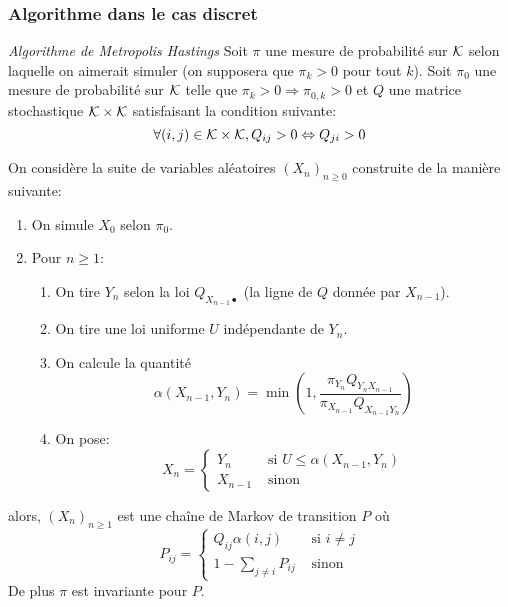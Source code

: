 \subsubsection{Algorithme dans le cas discret}

\begin{propriete}{\textit{Algorithme de Metropolis Hastings}}
Soit $\pi$ une mesure de probabilité sur $\mathcal{K}$ selon laquelle on aimerait simuler (on supposera que $\pi_k > 0$ pour tout $k$).
Soit $\pi_0$ une mesure de probabilité sur $\mathcal{K}$ telle que $\pi_k > 0\Rightarrow \pi_{0,k} > 0$ et $Q$ une matrice stochastique $\mathcal{K} \times \mathcal{K}$ satisfaisant la condition suivante:
$$\forall (i, j) \in \mathcal{K}\times \mathcal{K}, Q_{ij} > 0 \Leftrightarrow Q_{ji} > 0$$ 

On considère la suite de variables aléatoires $(X_n)_{n\geq 0}$ construite de la manière suivante:
\begin{enumerate}
\item On simule $X_0$ selon $\pi_0$.
\item Pour $n\geq 1$:
\begin{enumerate}
\item On tire $Y_n$ selon la loi $Q_{X_{n-1}\bullet}$ (la ligne de $Q$ donnée par $X_{n-1}$).
\item On tire une loi uniforme $U$ indépendante de $Y_n$.
\item On calcule la quantité 
$$\alpha(X_{n-1}, Y_n) = \min\left(1, \frac{\pi_{Y_n}Q_{Y_n X_{n-1}}}{\pi_{X_{n - 1}}Q_{X_{n-1}Y_n}}\right)$$
\item On pose:
$$X_n = \left\lbrace
\begin{array}{lr}
Y_n & \text{ si } U\leq\alpha(X_{n-1}, Y_n)\\
X_{n - 1} &\text{ sinon}
\end{array}
 \right.$$
\end{enumerate}
\end{enumerate}
alors, $(X_n)_{n \geq 1}$ est une chaîne de Markov de transition $P$ où
$$P_{ij} = \left\lbrace \begin{array}{lr}
Q_{ij}\alpha(i, j) & \text{ si } i\neq j\\
1 - \sum_{j\neq i} P_{ij} &\text{ sinon}
\end{array} \right.$$
De plus $\pi$ est invariante pour $P$.
\end{propriete}
